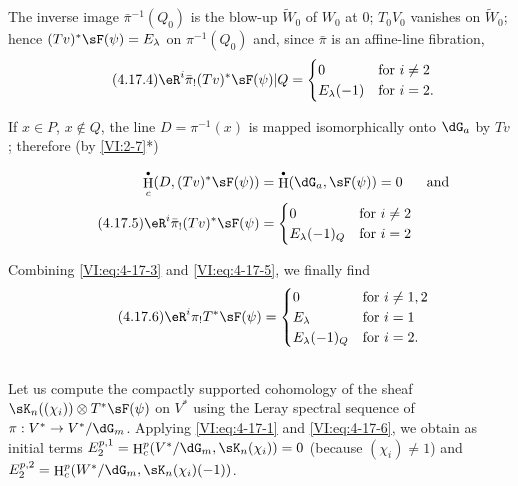 \documentclass[oneside]{book}
\DeclareMathOperator{\h}{H}
\theoremstyle{sga-source}
\theoremstyle{sga-source-dash}
\theoremstyle{sga-source-dotdash}
\theoremstyle{sga-source-number-note-dash}
\theoremstyle{sga-source-note-number-dotdash}
\theoremstyle{sga-source-example-dotdash}
\theoremstyle{sga-source-inline-number}
\theoremstyle{sga-source-bare-number}
\theoremstyle{sga-source}
\let\oldbullet\bullet
\renewcommand{\bullet}{\textnormal{\tiny$\oldbullet$}}
\newcommand{\PrintPage}[1]{}\newcommand{\MathPage}[1]{}\newcommand{\PrintCite}[2]{#1}\newcommand{\var}[3]{#1}
\begin{document}
The inverse image $\bar\pi^{-1}(Q_0)$ is the blow-up $\widetilde W_0$ of 
$W_0$ at $0$; \var{$T_0 V_0$ vanishes}{$T_0 v_0$ vanishes}{S45-SOL-0849} on $\widetilde W_0$; hence 
$(T v)^\ast \sF(\psi)=E_\lambda$ \var{on $\pi^{-1}(Q_0)$}{on $\bar\pi^{-1}(Q_0)$}{S45-SOL-0850} and, since $\bar\pi$ is an 
affine-line fibration, 
\begin{equation*}\tag{4.17.4}\label{VI:eq:4-17-4}
  \eR^i \bar\pi_! (T v)^\ast \sF(\psi)|Q = 
    \begin{cases}
      0 & \text{for $i\ne 2$} \\
      E_\lambda(-1) & \text{for $i=2$.} 
    \end{cases} 
\end{equation*}

If $x\in P$, $x\notin Q$, the line \var{$D=\pi^{-1}(x)$}{$D=\bar\pi^{-1}(x)$}{S45-SOL-0851} is mapped 
isomorphically onto $\dG_a$ by $T v$; therefore (by 
\ref{VI:2-7}*) 
\PrintPage{206}
\begin{align} \notag 
  \h_c^\bullet(D,(T v)^\ast \sF(\psi)) &= \h^\bullet(\dG_a,\sF(\psi)) = 0 && \text{and} \\
  \tag{4.17.5}\label{VI:eq:4-17-5}
  \eR^i \bar\pi_! (T v)^\ast \sF(\psi) 
    &= \begin{cases} 
         0 & \text{for $i\ne 2$} \\
         E_\lambda(-1)_Q & \text{for $i=2$} 
       \end{cases} 
\end{align}

Combining \eqref{VI:eq:4-17-3} and \eqref{VI:eq:4-17-5}, we finally find 
\begin{equation*}\tag{4.17.6}\label{VI:eq:4-17-6}
  \eR^i \pi_! T^\ast\sF(\psi) = 
    \begin{cases}
      0 & \text{for $i\ne 1,2$} \\
      E_\lambda & \text{for $i=1$} \\
      E_\lambda(-1)_Q & \text{for $i=2$.} 
    \end{cases}
\end{equation*}





\subsection{}\label{VI:4-18}

Let us compute the compactly supported cohomology of the sheaf 
$\sK_n((\chi_i))\otimes T^\ast \sF(\psi)$ on $V^\ast$ using the 
Leray spectral sequence of $\pi:V^\ast\to V^\ast/\dG_m$. Applying 
\eqref{VI:eq:4-17-1} and \eqref{VI:eq:4-17-6}, we obtain as initial terms 
$E_2^{p,1} = \h_c^p(V^\ast/\dG_m,\sK_n(\chi_i)) = 0$ (because $(\chi_i)\ne 1$) 
and $E_2^{p,2} = \h_c^p(W^\ast/\dG_m,\sK_n(\chi_i)(-1))$. 
\end{document}
